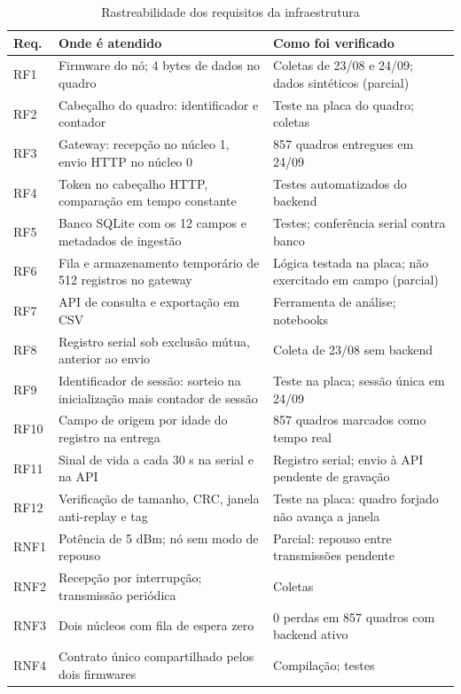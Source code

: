 \begin{table}[htb]
\centering
\caption{Rastreabilidade dos requisitos da infraestrutura}
\label{tab:rastreabilidade_infra}
\small
\begin{tabular}{lp{}p{}}
\hline
\textbf{Req.} & \textbf{Onde é atendido} & \textbf{Como foi verificado} \\
\hline
RF1  & Firmware do nó; 4 bytes de dados no quadro & Coletas de 23/08 e 24/09; dados sintéticos (parcial) \\
RF2  & Cabeçalho do quadro: identificador e contador & Teste na placa do quadro; coletas \\
RF3  & Gateway: recepção no núcleo 1, envio HTTP no núcleo 0 & 857 quadros entregues em 24/09 \\
RF4  & Token no cabeçalho HTTP, comparação em tempo constante & Testes automatizados do backend \\
RF5  & Banco SQLite com os 12 campos e metadados de ingestão & Testes; conferência serial contra banco \\
RF6  & Fila e armazenamento temporário de 512 registros no gateway & Lógica testada na placa; não exercitado em campo (parcial) \\
RF7  & API de consulta e exportação em CSV & Ferramenta de análise; notebooks \\
RF8  & Registro serial sob exclusão mútua, anterior ao envio & Coleta de 23/08 sem backend \\
RF9  & Identificador de sessão: sorteio na inicialização mais contador de sessão & Teste na placa; sessão única em 24/09 \\
RF10 & Campo de origem por idade do registro na entrega & 857 quadros marcados como tempo real \\
RF11 & Sinal de vida a cada 30 s na serial e na API & Registro serial; envio à API pendente de gravação \\
RF12 & Verificação de tamanho, CRC, janela anti-replay e tag & Teste na placa: quadro forjado não avança a janela \\
RNF1 & Potência de 5 dBm; nó sem modo de repouso & Parcial: repouso entre transmissões pendente \\
RNF2 & Recepção por interrupção; transmissão periódica & Coletas \\
RNF3 & Dois núcleos com fila de espera zero & 0 perdas em 857 quadros com backend ativo \\
RNF4 & Contrato único compartilhado pelos dois firmwares & Compilação; testes \\

\end{tabular}
\end{table}
